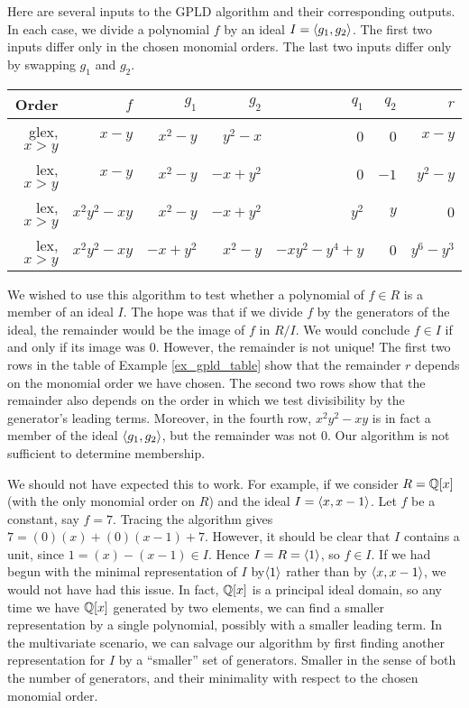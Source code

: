 \begin{example}
  \label{ex_gpld_table}
  Here are several inputs to the GPLD algorithm and their corresponding outputs.
  In each case, we divide a polynomial $f$ by an ideal $I = \left\langle g_1, g_2 \right\rangle$.
  The first two inputs differ only in the chosen monomial orders.
  The last two inputs differ only by swapping $g_1$ and $g_2$.
  \begin{center}
    \begin{tabular}{r|rrr|rrr}
      Order & $f$ & $g_1$ & $g_2$ & $q_1$ & $q_2$ & $r$ \\
      \hline
      glex, $x > y$ & $x - y$ & $x^2 - y$ &  $y^2 - x$ & $0$ &  $0$ &   $x - y$ \\
       lex, $x > y$ & $x - y$ & $x^2 - y$ & $-x + y^2$ & $0$ & $-1$ & $y^2 - y$ \\
      \hline
       lex, $x > y$ & $x^2y^2 - xy$ & $x^2 - y$ & $-x + y^2$ & $y^2$ & $y$ & $0$ \\
       lex, $x > y$ & $x^2y^2 - xy$ & $-x + y^2$ & $x^2 - y$ & $-xy^2 - y^4 + y$ & $0$ & $y^6 - y^3$
    \end{tabular}
  \end{center}
\end{example}

We wished to use this algorithm to test whether a polynomial of $f \in R$ is a member of an ideal $I$.
The hope was that if we divide $f$ by the generators of the ideal, the remainder would be the image of $f$ in $R/I$.
We would conclude $f \in I$ if and only if its image was 0.
However, the remainder is not unique!
The first two rows in the table of Example \ref{ex_gpld_table} show that the remainder $r$ depends on the monomial order we have chosen.
The second two rows show that the remainder also depends on the order in which we test divisibility by the generator's leading terms.
Moreover, in the fourth row, $x^2y^2 - xy$ is in fact a member of the ideal $\left\langle g_1, g_2 \right\rangle$, but the remainder was not 0.
Our algorithm is not sufficient to determine membership.

We should not have expected this to work.
For example, if we consider $R = \mathbb{Q}[x]$ (with the only monomial order on $R$) and the ideal $I = \left\langle x, x-1 \right\rangle$.
Let $f$ be a constant, say $f = 7$.
Tracing the algorithm gives $7 = (0)(x) + (0)(x-1) + 7$.
However, it should be clear that $I$ contains a unit, since $1 = (x) - (x-1) \in I$.
Hence $I = R = \left\langle 1 \right\rangle$, so $f \in I$.
If we had begun with the minimal representation of $I$ by$\left\langle 1 \right\rangle$ rather than by $\left\langle x, x-1 \right\rangle$, we would not have had this issue.
In fact, $\mathbb{Q}[x]$ is a principal ideal domain, so any time we have $\mathbb{Q}[x]$ generated by two elements,
we can find a smaller representation by a single polynomial, possibly with a smaller leading term. 
In the multivariate scenario, we can salvage our algorithm by first finding another representation for $I$ by a ``smaller'' set of generators.
Smaller in the sense of both the number of generators, and their minimality with respect to the chosen monomial order.

